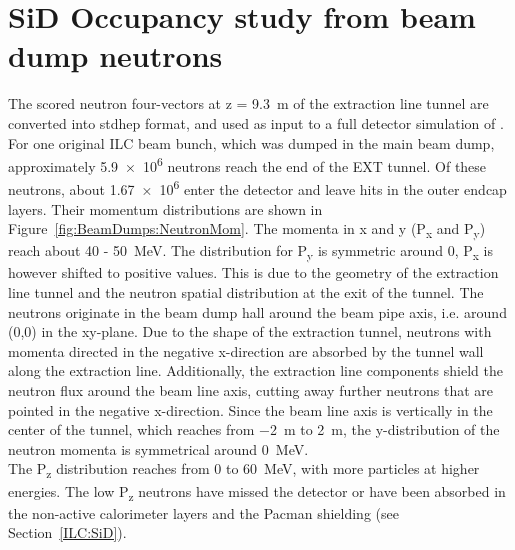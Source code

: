 \section{SiD Occupancy study from beam dump neutrons}
\label{BeamDumps:SiDocc}
The scored neutron four-vectors at z = \SI{9.3}{\meter} of the extraction line tunnel are converted into stdhep format, and used as input to a full detector simulation of \sid.
For one original ILC beam bunch, which was dumped in the main beam dump, approximately \num{5.9e6} neutrons reach the end of the EXT tunnel.
Of these neutrons, about \num{1.67e6} enter the \sid detector and leave hits in the outer endcap layers.
Their momentum distributions are shown in Figure~\ref{fig:BeamDumps:NeutronMom}.
The momenta in x and y (P\textsubscript{x} and P\textsubscript{y}) reach about 40 - \SI{50}{\MeV}.
The distribution for P\textsubscript{y} is symmetric around 0, P\textsubscript{x} is however shifted to positive values.
This is due to the geometry of the extraction line tunnel and the neutron spatial distribution at the exit of the tunnel.
The neutrons originate in the beam dump hall around the beam pipe axis, i.e. around (0,0) in the xy-plane.
Due to the shape of the extraction tunnel, neutrons with momenta directed in the negative x-direction are absorbed by the tunnel wall along the extraction line.
Additionally, the extraction line components shield the neutron flux around the beam line axis, cutting away further neutrons that are pointed in the negative x-direction.
Since the beam line axis is vertically in the center of the tunnel, which reaches from \SI{-2}{\meter} to \SI{2}{\meter}, the y-distribution of the neutron momenta is symmetrical around \SI{0}{\MeV}.
\\The P\textsubscript{z} distribution reaches from 0 to \SI{60}{\MeV}, with more particles at higher energies.
The low P\textsubscript{z} neutrons have missed the detector or have been absorbed in the non-active calorimeter layers and the Pacman shielding (see Section~\ref{ILC:SiD}).
